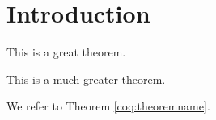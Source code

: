 \chapter{Introduction}


\begin{theorem}[Test][theoremname]
  This is a great theorem.
\end{theorem}

\begin{theorem}[Test2][theoremname2]
  This is a much greater theorem.
\end{theorem}

We refer to Theorem \ref{coq:theoremname}.

